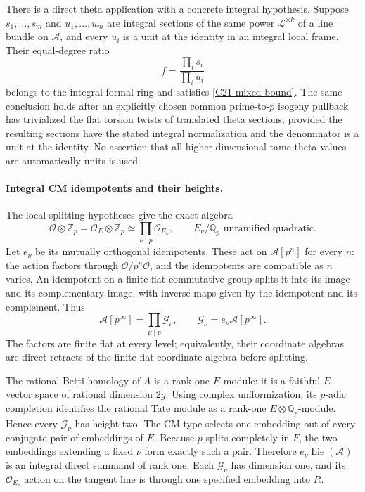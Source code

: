 \documentclass[11pt]{article}
\newcommand{\Q}{\mathbb Q}\newcommand{\C}{\mathbb C}\newcommand{\Z}{\mathbb Z}\newcommand{\R}{\mathbb R}\newcommand{\A}{\mathbb A}\newcommand{\OO}{\mathcal O}
\providecommand{\mathscr}[1]{\mathcal{#1}}
\theoremstyle{definition}\newtheorem{definition}[theorem]{Definition}\newtheorem{remark}[theorem]{Remark}
\begin{document}
There is a direct theta application with a concrete integral
hypothesis.  Suppose $s_1,\ldots,s_m$ and
$u_1,\ldots,u_m$ are integral sections of the same power
$\mathscr L^{\otimes k}$ of a line bundle on $\mathcal A$,
and every $u_i$ is a unit at the identity in an integral local
frame.  Their equal-degree ratio
\begin{equation}\label{C21-section-ratio}
 f=\frac{\prod_i s_i}{\prod_i u_i}
\end{equation}
belongs to the integral formal ring and satisfies
\eqref{C21-mixed-bound}.  The same conclusion holds after
an explicitly chosen common prime-to-$p$ isogeny pullback
has trivialized the flat torsion twists of translated theta
sections, provided the resulting sections have the stated
integral normalization and the denominator is a unit at the
identity.  No assertion that all higher-dimensional tame
theta values are automatically units is used.

\paragraph{Integral CM idempotents and their heights.}
The local splitting hypotheses give the exact algebra
\[
 \mathcal O\otimes\Z_p
       =\mathcal O_E\otimes\Z_p
       \simeq\prod_{\nu\mid p}\mathcal O_{E_\nu},
 \qquad E_\nu/\Q_p\text{ unramified quadratic}.
\]
Let $e_\nu$ be its mutually orthogonal idempotents.
These act on $\mathcal A[p^n]$ for every $n$: the action
factors through $\mathcal O/p^n\mathcal O$, and the
idempotents are compatible as $n$ varies.
An idempotent on a finite flat commutative group splits it
into its image and its complementary image, with inverse
maps given by the idempotent and its complement.
Thus
\[
 \mathcal A[p^\infty]=\prod_{\nu\mid p}\mathcal G_\nu,
       \qquad \mathcal G_\nu=e_\nu\mathcal A[p^\infty].
\]
The factors are finite flat at every level; equivalently,
their coordinate algebras are direct retracts of the finite
flat coordinate algebra before splitting.

The rational Betti homology of $A$ is a rank-one $E$-module:
it is a faithful $E$-vector space of rational dimension $2g$.
Using complex uniformization, its $p$-adic completion identifies
the rational Tate module as a rank-one
$E\otimes\Q_p$-module.  Hence every $\mathcal G_\nu$
has height two.
The CM type selects one embedding out of every conjugate
pair of embeddings of $E$.  Because $p$ splits completely
in $F$, the two embeddings extending a fixed $\nu$ form
exactly such a pair.  Therefore
$e_\nu\operatorname{Lie}(\mathcal A)$ is an integral direct
summand of rank one.  Each $\mathcal G_\nu$ has dimension
one, and its $\mathcal O_{E_\nu}$ action on the tangent
line is through one specified embedding into $R$.
\end{document}
